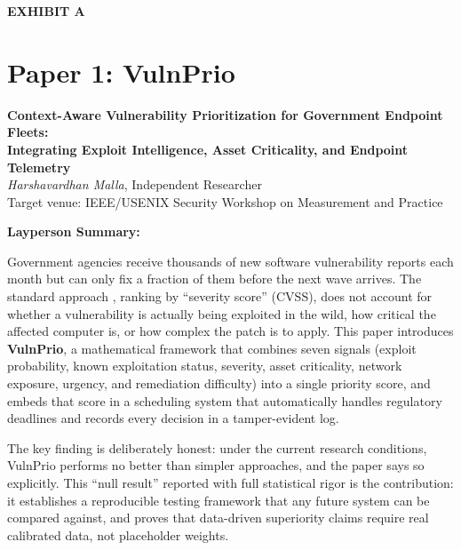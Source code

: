 \documentclass[12pt,letterpaper]{article}
\newcommand{\exhibitlabel}[1]{%
  \begin{center}
    \large\bfseries\textcolor{headblue}{#1}
  \end{center}
}
\begin{document}
\newpage
\setcounter{page}{1}

\exhibitlabel{EXHIBIT A}
\section{Paper 1: VulnPrio}

\begin{center}
  \textbf{\large Context-Aware Vulnerability Prioritization for Government Endpoint Fleets:\\
  Integrating Exploit Intelligence, Asset Criticality, and Endpoint Telemetry}\\[0.5em]
  \textit{Harshavardhan Malla}, Independent Researcher\\[0.5em]
  Target venue: IEEE/USENIX Security Workshop on Measurement and Practice
\end{center}

\vspace{1em}
\noindent\textbf{Layperson Summary:}

Government agencies receive thousands of new software vulnerability reports each month
but can only fix a fraction of them before the next wave arrives. The standard approach
,  ranking by ``severity score'' (CVSS), does not account for whether a vulnerability
is actually being exploited in the wild, how critical the affected computer is, or how
complex the patch is to apply. This paper introduces \textbf{VulnPrio}, a mathematical
framework that combines seven signals (exploit probability, known exploitation status,
severity, asset criticality, network exposure, urgency, and remediation difficulty)
into a single priority score, and embeds that score in a scheduling system that
automatically handles regulatory deadlines and records every decision in a
tamper-evident log.

The key finding is deliberately honest: under the current research conditions,
VulnPrio performs no better than simpler approaches, and the paper says so
explicitly. This ``null result'' reported with full statistical rigor is the
contribution: it establishes a reproducible testing framework that any future
system can be compared against, and proves that data-driven superiority claims
require real calibrated data, not placeholder weights.
\end{document}
